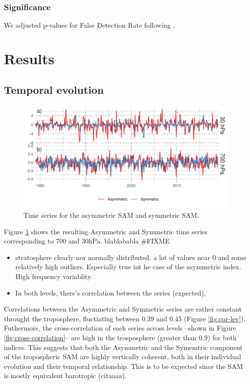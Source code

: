 \documentclass[]{ametsocV5}
\begin{document}
\subsubsection{Significance}

We adjusted p-values for False Detection Rate following
\citet{wilks2016}.

\section{Results}

\subsection{Temporal evolution}

\begin{figure}
\includegraphics{asymsam-timeseries-1} \caption[Time series for the asymmetric SAM and symmetric SAM]{Time series for the asymmetric SAM and symmetric SAM.}\label{fig:asymsam-timeseries}
\end{figure}

Figure \ref{fig:asymsam-timeseries} shows the resulting Asymmetric and
Symmetric time series corresponding to 700 and 30hPa. blablababla
\#FIXME

\begin{itemize}
\item
  stratosphere clearly nor normally distributed. a lot of values near 0
  and some relatively high outliers. Especially true int he case of the
  asymmetric index. High frequency variablity.
\item
  In both levels, there's correlation between the series (expected),
\end{itemize}

Correlations between the Asymmetric and Symmetric series are rather
constant throught the troposphere, fluctiating between 0.39 and 0.45
(Figure \ref{fig:cor-lev}). Futhermore, the cross-correlation of each
series across levels --shown in Figure \ref{fig:cross-correlation}-- are
high in the trosposphere (greater than 0.9) for both indices. This
suggests that both the Asymmetric and the Symemtric component of the
tropospheric SAM are highly vertically coherent, both in their
individual evolution and their temporal relationship. This is to be
expected since the SAM is mostly equivalent barotropic (citaaaa).
\end{document}
